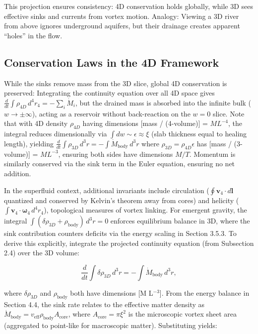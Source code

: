 \documentclass{article}
\begin{document}
This projection ensures consistency: 4D conservation holds globally, while 3D sees effective sinks and currents from vortex motion. Analogy: Viewing a 3D river from above ignores underground aquifers, but their drainage creates apparent ``holes'' in the flow.

\subsection{Conservation Laws in the 4D Framework}

While the sinks remove mass from the 3D slice, global 4D conservation is preserved: Integrating the continuity equation over all 4D space gives $\frac{d}{dt} \int \rho_{4D} \, d^4 r_4 = -\sum_i \dot{M}_i$, but the drained mass is absorbed into the infinite bulk ($w \to \pm \infty$), acting as a reservoir without back-reaction on the $w=0$ slice. Note that with 4D density $\rho_{4D}$ having dimensions [mass / (4-volume)] = $M L^{-4}$, the integral reduces dimensionally via $\int dw \sim \epsilon \approx \xi$ (slab thickness equal to healing length), yielding $\frac{d}{dt} \int \rho_{3D} \, d^3 r = -\int \dot{M}_{\text{body}} \, d^3 r$ where $\rho_{3D} = \rho_{4D} \epsilon$ has [mass / (3-volume)] = $M L^{-3}$, ensuring both sides have dimensions $M / T$. Momentum is similarly conserved via the sink term in the Euler equation, ensuring no net addition.

In the superfluid context, additional invariants include circulation ($\oint \mathbf{v}_4 \cdot d\mathbf{l}$ quantized and conserved by Kelvin's theorem away from cores) and helicity ($\int \mathbf{v}_4 \cdot \boldsymbol{\omega}_4 \, d^4 r_4$), topological measures of vortex linking. For emergent gravity, the integral $\int (\delta\rho_{3D} + \rho_{\text{body}}) \, d^3 r = 0$ enforces equilibrium balance in 3D, where the sink contribution counters deficits via the energy scaling in Section 3.5.3. To derive this explicitly, integrate the projected continuity equation (from Subsection 2.4) over the 3D volume:

\[
\frac{d}{dt} \int \delta\rho_{3D} \, d^3 r = - \int \dot{M}_{\text{body}} \, d^3 r,
\]

where $\delta\rho_{3D}$ and $\rho_{\text{body}}$ both have dimensions [M L$^{-3}$]. From the energy balance in Section 4.4, the sink rate relates to the effective matter density as $\dot{M}_{\text{body}} = v_{\text{eff}} \rho_{\text{body}} A_{\text{core}}$, where $A_{\text{core}} = \pi \xi^2$ is the microscopic vortex sheet area (aggregated to point-like for macroscopic matter). Substituting yields:
\end{document}
